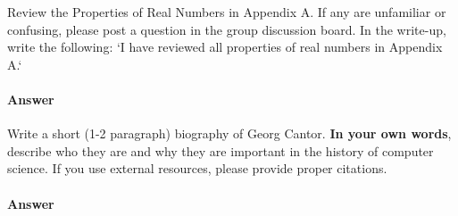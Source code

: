 \documentclass{article}
\begin{document}
\collab{\todo{}}

Review the Properties of Real Numbers in Appendix A.  If any are unfamiliar or
confusing, please post a question in the group discussion board.  In the
write-up, write the following: `I have reviewed all properties of real numbers
in Appendix A.`

\paragraph{Answer}



\collab{\todo{}}

Write a short (1-2 paragraph) biography of Georg Cantor.
\textbf{In your own words}, describe who they are and why they are important in
the history of computer science.  If you use external resources, please provide
proper citations.

\paragraph{Answer}



\end{document}
